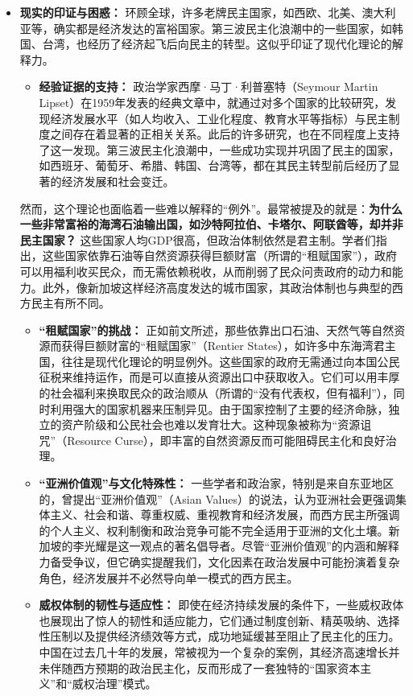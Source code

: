 \documentclass[UTF8, 10pt]{ctexbook}
\begin{document}
\begin{itemize}
    \item \textbf{现实的印证与困惑：} 环顾全球，许多老牌民主国家，如西欧、北美、澳大利亚等，确实都是经济发达的富裕国家。第三波民主化浪潮中的一些国家，如韩国、台湾，也经历了经济起飞后向民主的转型。这似乎印证了现代化理论的解释力。
    \begin{itemize}
        \item \textbf{经验证据的支持：} 政治学家西摩·马丁·利普塞特（Seymour Martin Lipset）在1959年发表的经典文章中，就通过对多个国家的比较研究，发现经济发展水平（如人均收入、工业化程度、教育水平等指标）与民主制度之间存在着显著的正相关关系。此后的许多研究，也在不同程度上支持了这一发现。第三波民主化浪潮中，一些成功实现并巩固了民主的国家，如西班牙、葡萄牙、希腊、韩国、台湾等，都在其民主转型前后经历了显著的经济发展和社会变迁。
    \end{itemize}
    然而，这个理论也面临着一些难以解释的“例外”。最常被提及的就是：\textbf{为什么一些非常富裕的海湾石油输出国，如沙特阿拉伯、卡塔尔、阿联酋等，却并非民主国家？} 这些国家人均GDP很高，但政治体制依然是君主制。学者们指出，这些国家依靠石油等自然资源获得巨额财富（所谓的“租赋国家”），政府可以用福利收买民众，而无需依赖税收，从而削弱了民众问责政府的动力和能力。此外，像新加坡这样经济高度发达的城市国家，其政治体制也与典型的西方民主有所不同。
    \begin{itemize}
        \item \textbf{“租赋国家”的挑战：} 正如前文所述，那些依靠出口石油、天然气等自然资源而获得巨额财富的“租赋国家”（Rentier States），如许多中东海湾君主国，往往是现代化理论的明显例外。这些国家的政府无需通过向本国公民征税来维持运作，而是可以直接从资源出口中获取收入。它们可以用丰厚的社会福利来换取民众的政治顺从（所谓的“没有代表权，但有福利”），同时利用强大的国家机器来压制异见。由于国家控制了主要的经济命脉，独立的资产阶级和公民社会也难以发育壮大。这种现象被称为“资源诅咒”（Resource Curse），即丰富的自然资源反而可能阻碍民主化和良好治理。
        \item \textbf{“亚洲价值观”与文化特殊性：} 一些学者和政治家，特别是来自东亚地区的，曾提出“亚洲价值观”（Asian Values）的说法，认为亚洲社会更强调集体主义、社会和谐、尊重权威、重视教育和经济发展，而西方民主所强调的个人主义、权利制衡和政治竞争可能不完全适用于亚洲的文化土壤。新加坡的李光耀是这一观点的著名倡导者。尽管“亚洲价值观”的内涵和解释力备受争议，但它确实提醒我们，文化因素在政治发展中可能扮演着复杂角色，经济发展并不必然导向单一模式的西方民主。
        \item \textbf{威权体制的韧性与适应性：} 即使在经济持续发展的条件下，一些威权政体也展现出了惊人的韧性和适应能力，它们通过制度创新、精英吸纳、选择性压制以及提供经济绩效等方式，成功地延缓甚至阻止了民主化的压力。中国在过去几十年的发展，常被视为一个复杂的案例，其经济高速增长并未伴随西方预期的政治民主化，反而形成了一套独特的“国家资本主义”和“威权治理”模式。

\end{itemize}
\end{itemize}
\end{document}
